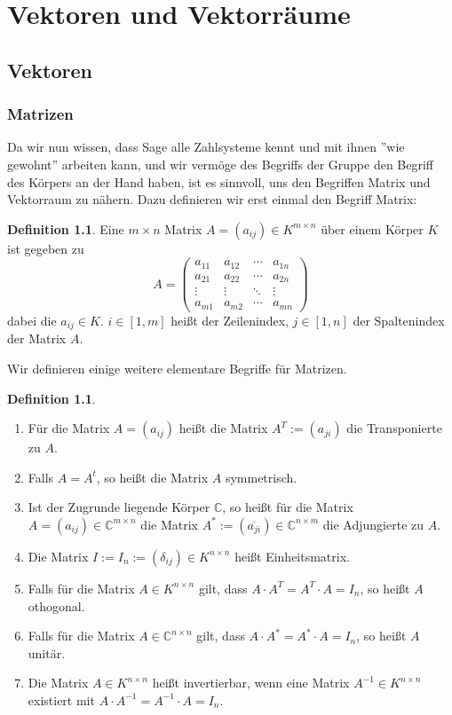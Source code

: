\documentclass[fontsize=12pt,paper=a4,twoside,bibtotoc,idxtotoc,
liststotoc,pagesize,BCOR1.2cm,DIV15,chapterprefix,pagesize=pdftex]{scrbook}
\theoremstyle{plain}
\theoremstyle{definition}
\newtheorem{df}[equation]{Definition}
\theoremstyle{remark}
\begin{document}
\chapter{Vektoren und Vektorräume}
\section{Vektoren}
\subsection{Matrizen}
Da wir nun wissen, dass Sage alle Zahlsysteme kennt und mit ihnen ''wie gewohnt'' arbeiten kann, und wir vermöge des Begriffs der Gruppe den Begriff des Körpers an der Hand haben, ist es 
sinnvoll, uns den Begriffen Matrix und Vektorraum zu nähern. Dazu definieren wir erst einmal den Begriff Matrix:
\begin{df}
Eine $m \times n$ Matrix $A=(a_{ij}) \in K^{m\times n}$ über einem Körper $K$ ist gegeben zu
\[ A = \left( \begin{array}{cccc}
a_{11} & a_{12} & \cdots & a_{1n} \\
a_{21} & a_{22} & \cdots & a_{2n} \\
\vdots & \vdots & \ddots & \vdots \\
a_{m1} & a_{m2} & \cdots & a_{mn} 
\end{array} \right) \] 
dabei die $a_{ij} \in K$. $i\in[1,m]$ heißt der Zeilenindex, $j\in [1,n]$ der Spaltenindex der Matrix $A$.
\end{df}
Wir definieren einige weitere elementare Begriffe für Matrizen.
\begin{df}
\begin{enumerate}
\item Für die Matrix $A=(a_{ij})$ heißt die Matrix $A^T:=(a_{ji})$ die Transponierte zu $A$.
\item Falls $A=A^t$, so heißt die Matrix $A$ symmetrisch. 
\item Ist der Zugrunde liegende Körper $\mathbb{C}$, so heißt für die Matrix $A=(a_{ij})\in \mathbb{C}^{m\times n}$ die Matrix $A^* :=
(\overline{a_{ji}}) \in \mathbb{C}^{n \times m}$ die Adjungierte zu $A$.
\item Die Matrix $I:=I_n:=(\delta_{ij}) \in K^{n \times n}$ heißt Einheitsmatrix.
\item Falls für die Matrix $A\in K^{n \times n}$ gilt, dass $A \cdot A^T=A^T \cdot A=I_n$, so heißt $A$ othogonal.
\item Falls für die Matrix $A\in \mathbb{C}^{n \times n}$ gilt, dass $A \cdot A^*=A^* \cdot A=I_n$, so heißt $A$ unitär.
\item Die Matrix $A\in K^{n \times n}$ heißt invertierbar, wenn eine Matrix $A^{-1}\in K^{n \times n}$ existiert mit  $A \cdot
A^{-1}=A^{-1} \cdot A=I_n$.
\end{enumerate}
\end{df}
\end{document}
